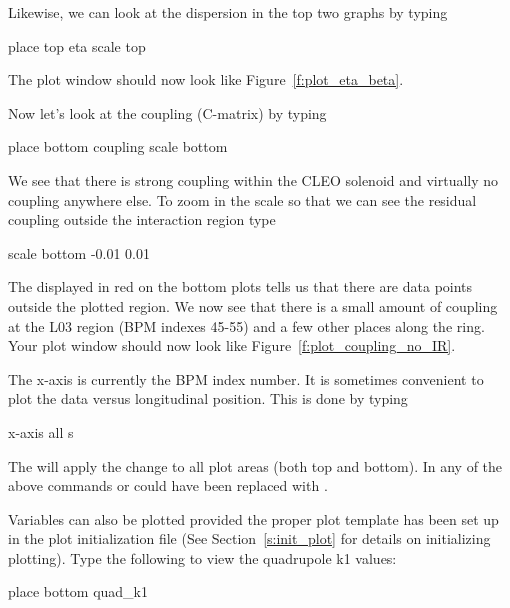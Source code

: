 Likewise, we can look at the dispersion in the top two graphs by
typing
\begin{example}
  place top eta
  scale top
\end{example}
The plot window should now look like Figure~\ref{f:plot_eta_beta}.

Now let's look at the coupling (C-matrix) by typing
\begin{example}
  place bottom coupling
  scale bottom
\end{example}
We see that there is strong coupling within the CLEO solenoid and
virtually no coupling anywhere else. To zoom in the scale so that we
can see the residual coupling outside the interaction region type
\begin{example}
  scale bottom -0.01 0.01
\end{example}
The  displayed in red on the bottom plots tells us
that there are data points outside the plotted region.  We now see that
there is a small amount of coupling at the L03 region (BPM indexes
45-55) and a few other places along the ring. Your plot window should
now look like Figure~\ref{f:plot_coupling_no_IR}.

The x-axis is currently the BPM index number. It is sometimes
convenient to plot the data versus longitudinal position. This is done
by typing
\begin{example}
  x-axis all s
\end{example}

The  will apply the change to all plot areas (both top and
bottom). In any of the above commands  or  could
have been replaced with .

Variables can also be plotted provided the proper plot template has
been set up in the plot initialization file (See
Section~\ref{s:init_plot} for details on initializing plotting). Type
the following to view the quadrupole k1 values:
\begin{example}
  place bottom quad_k1
\end{example}

